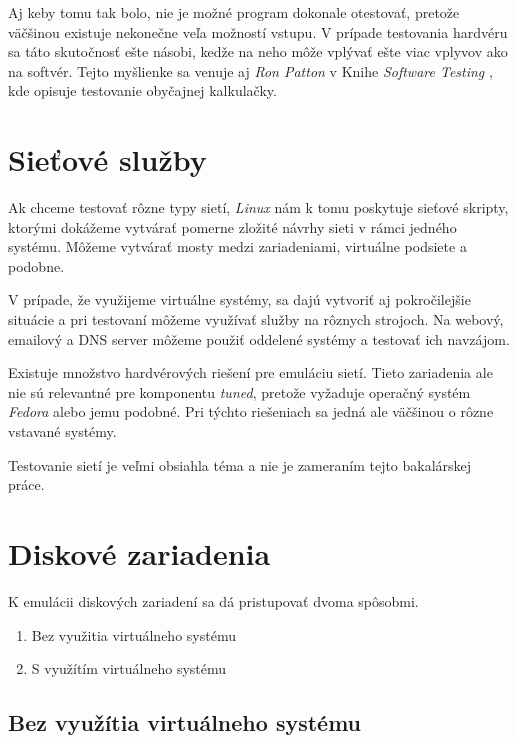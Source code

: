 Aj keby tomu tak bolo, nie je možné program dokonale otestovať, pretože
väčšinou existuje nekonečne veľa možností vstupu. V prípade testovania hardvéru
sa táto skutočnosť ešte násobi, kedže na neho môže vplývať ešte viac vplyvov
ako na softvér. Tejto myšlienke sa venuje aj \emph{Ron Patton} v Knihe
\emph{Software Testing} \cite{Software_testing_patton}, kde opisuje testovanie
obyčajnej kalkulačky.

\section{Sieťové služby}

Ak chceme testovať rôzne typy sietí, \emph{Linux} nám k tomu poskytuje sieťové
skripty, ktorými dokážeme vytvárať pomerne zložité návrhy sieti v rámci jedného
systému. Môžeme vytvárať mosty medzi zariadeniami, virtuálne podsiete a
podobne.

V prípade, že využijeme virtuálne systémy, sa dajú vytvoriť aj pokročilejšie
situácie a pri testovaní môžeme využívať služby na rôznych strojoch. Na webový,
emailový a DNS server môžeme použiť oddelené systémy a testovať ich navzájom.

Existuje množstvo hardvérových riešení pre emuláciu sietí. Tieto zariadenia ale
nie sú relevantné pre komponentu \emph{tuned}, pretože vyžaduje operačný systém
\emph{Fedora} alebo jemu podobné. Pri týchto riešeniach sa jedná ale väčšinou o
rôzne vstavané systémy.

Testovanie sietí je veľmi obsiahla téma a nie je zameraním tejto bakalárskej
práce.

%
%

\section{Diskové zariadenia}

K emulácii diskových zariadení sa dá pristupovať dvoma spôsobmi. 

\begin{enumerate}
    \item Bez využitia virtuálneho systému \label{item:without-virt-system}
    \item S využítím virtuálneho systému \label{item:with-virt-system}
\end{enumerate}

%
%

\subsection{Bez využítia virtuálneho systému}

